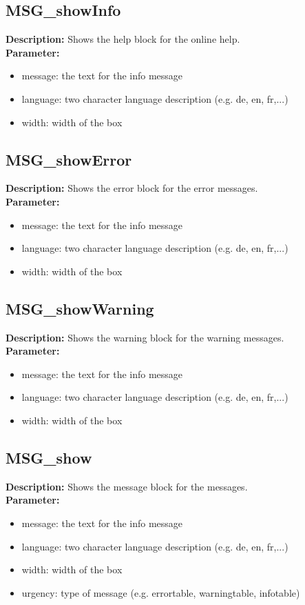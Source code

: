 \subsection{MSG\_showInfo}
\textbf{Description:} Shows the help block for the online help.\\
\textbf{Parameter:}
\begin{itemize}
\item message: the text for the info message
\item language: two character language description (e.g. de, en, fr,...)
\item width: width of the box
\end{itemize}

\subsection{MSG\_showError}
\textbf{Description:} Shows the error block for the error messages.\\
\textbf{Parameter:}
\begin{itemize}
\item message: the text for the info message
\item language: two character language description (e.g. de, en, fr,...)
\item width: width of the box
\end{itemize}

\subsection{MSG\_showWarning}
\textbf{Description:} Shows the warning block for the warning messages.\\
\textbf{Parameter:}
\begin{itemize}
\item message: the text for the info message
\item language: two character language description (e.g. de, en, fr,...)
\item width: width of the box
\end{itemize}

\subsection{MSG\_show}
\textbf{Description:} Shows the message block for the messages.\\
\textbf{Parameter:}
\begin{itemize}
\item message: the text for the info message
\item language: two character language description (e.g. de, en, fr,...)
\item width: width of the box
\item urgency: type of message (e.g. errortable, warningtable, infotable)
\end{itemize}

